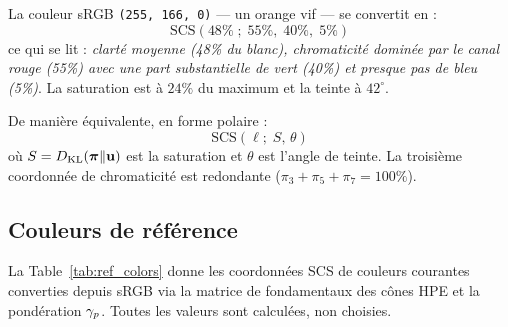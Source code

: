 \documentclass[12pt,a4paper]{article}
\begin{document}
\begin{example}
La couleur sRGB \texttt{(255, 166, 0)} --- un orange vif --- se
convertit en :
\[
  \mathrm{SCS}(48\%\;;\; 55\%,\; 40\%,\; 5\%)
\]
ce qui se lit : \emph{clart\'e moyenne (48\% du blanc), chromaticit\'e
domin\'ee par le canal rouge (55\%) avec une part substantielle de vert
(40\%) et presque pas de bleu (5\%)}. La saturation est \`a $24\%$ du
maximum et la teinte \`a $42^\circ$.
\end{example}

De mani\`ere \'equivalente, en forme polaire :
\begin{equation}
  \mathrm{SCS}(\ell;\; S,\, \theta)
\end{equation}
o\`u $S = D_{\mathrm{KL}}(\bm{\pi}\|\mathbf{u})$ est la saturation et $\theta$
est l'angle de teinte. La troisi\`eme coordonn\'ee de chromaticit\'e
est redondante ($\pi_3 + \pi_5 + \pi_7 = 100\%$).

\subsection{Couleurs de r\'ef\'erence}

La Table~\ref{tab:ref_colors} donne les coordonn\'ees SCS de couleurs
courantes converties depuis sRGB via la matrice de fondamentaux des
c\^ones HPE et la pond\'eration $\gamma_{p}$. Toutes les valeurs sont
calcul\'ees, non choisies.
\end{document}
